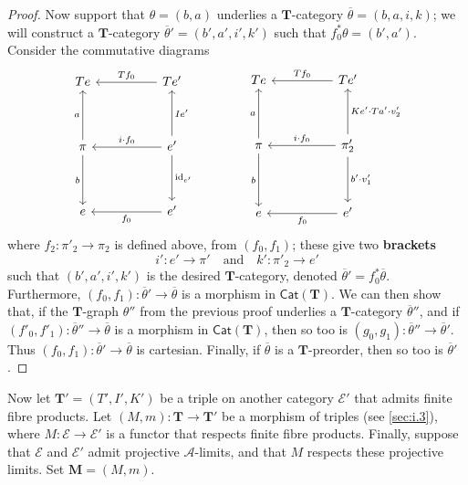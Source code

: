 \documentclass[fleqn]{article}
\newcommand{\unsure}[1]{{\color{purple}\textbf{#1}}}
\newcommand{\id}{\mathrm{id}}
\newcommand{\TT}{\mathbf{T}}
\newcommand{\MM}{\mathbf{M}}
\newcommand{\textand}{\quad\text{and}\quad}
\newcommand{\cat}[1]{\mathcal{#1}}
\newcommand{\Cat}[1]{\mathsf{#1}}
\begin{document}
\begin{proof}
  Now support that $\theta=(b,a)$ underlies a $\TT$-category $\overline{\theta}=(b,a,i,k)$;
  we will construct a $\TT$-category $\overline{\theta}'=(b',a',i',k')$ such that $f_0^*\theta=(b',a')$.
  Consider the commutative diagrams
  \[
    \begin{tikzcd}[sep=huge]
      Te
    & Te'
        \ar[l,swap,"Tf_0"]
    \\\pi
        \ar[u,"a"]
        \ar[d,swap,"b"]
    & e'
        \ar[u,swap,"Ie'"]
        \ar[l,swap,"i\cdot f_0"]
        \ar[d,"\id_{e'}"]
    \\e
    & e'
        \ar[l,"f_0"]
    \end{tikzcd}
    \qquad\qquad
    \begin{tikzcd}[sep=huge]
      Te
    & Te'
        \ar[l,swap,"Tf_0"]
    \\\pi
        \ar[u,"a"]
        \ar[d,swap,"b"]
    & \pi'_2
        \ar[u,swap,"Ke'\cdot Ta'\cdot v'_2"]
        \ar[l,swap,"i\cdot f_0"]
        \ar[d,"b'\cdot v'_1"]
    \\e
    & e'
        \ar[l,"f_0"]
    \end{tikzcd}
  \]
  where $f_2\colon\pi'_2\to\pi_2$ is defined above, from $(f_0,f_1)$;
  these give two \unsure{brackets}
  \[
    i'\colon e'\to\pi'
    \textand
    k'\colon\pi'_2\to e'
  \]
  such that $(b',a',i',k')$ is the desired $\TT$-category, denoted $\overline{\theta}'=f_0^*\overline{\theta}$.
  Furthermore, $(f_0,f_1)\colon\overline{\theta}'\to\overline{\theta}$ is a morphism in $\Cat{Cat}(\TT)$.
  We can then show that, if the $\TT$-graph $\theta''$ from the previous proof underlies a $\TT$-category $\overline{\theta}''$, and if $(f'_0,f'_1)\colon\overline{\theta}''\to\overline{\theta}$ is a morphism in $\Cat{Cat}(\TT)$, then so too is $(g_0,g_1)\colon\overline{\theta}''\to\overline{\theta}'$.
  Thus $(f_0,f_1)\colon\overline{\theta}'\to\overline{\theta}$ is cartesian.
  Finally, if $\overline{\theta}$ is a $\TT$-preorder, then so too is $\overline{\theta}'$.
\end{proof}

Now let $\TT'=(T',I',K')$ be a triple on another category $\cat{E}'$ that admits finite fibre products.
Let $(M,m)\colon\TT\to\TT'$ be a morphism of triples (see \cref{sec:i.3}), where $M\colon\cat{E}\to\cat{E}'$ is a functor that respects finite fibre products.
Finally, suppose that $\cat{E}$ and $\cat{E}'$ admit projective $\cat{A}$-limits, and that $M$ respects these projective limits.
Set $\MM=(M,m)$.
\end{document}
